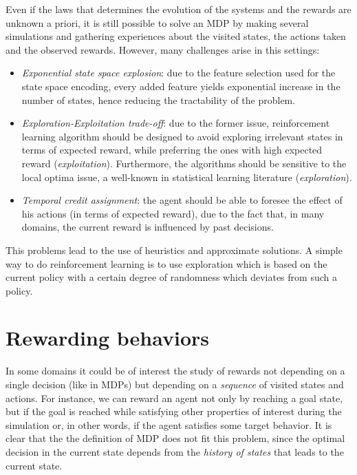 \medskip
Even if the laws that determines the evolution of the systems and the rewards are unknown a priori, it is still possible to solve an MDP by making several simulations and gathering experiences about the visited states, the actions taken and the observed rewards. However, many challenges arise in this settings:
\begin{itemize}
	\item \emph{Exponential state space explosion}: due to the feature selection used for the state space encoding, every added feature yields exponential increase in the number of states, hence reducing the tractability of the problem.
	\item \emph{Exploration-Exploitation trade-off}: due to the former issue, reinforcement learning algorithm should be designed to avoid exploring irrelevant states in terms of expected reward, while preferring the ones with high expected reward (\emph{exploitation}). Furthermore, the algorithms should be sensitive to the local optima issue, a well-known in statistical learning literature (\emph{exploration}).
	\item \emph{Temporal credit assignment}: the agent should be able to foresee the effect of his actions (in terms of expected reward), due to the fact that, in many domains, the current reward is influenced by past decisions.
\end{itemize}

This problems lead to the use of heuristics and approximate solutions. A simple way to do reinforcement learning is to use exploration which is based on the current policy with a certain degree of randomness which deviates from such a policy.

\section{Rewarding behaviors}
In some domains it could be of interest the study of rewards not depending on a single decision (like in MDPs) but depending on a \emph{sequence} of visited states and actions. For instance, we can reward an agent not only by reaching a goal state, but if the goal is reached while satisfying other properties of interest during the simulation or, in other words, if the agent satisfies some target behavior. It is clear that the the definition of MDP does not fit this problem, since the optimal decision in the current state depends from the \emph{history of states} that leads to the current state.

\medskip

